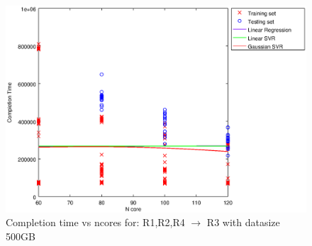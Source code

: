 
\begin {figure}[hbtp]
\centering
\includegraphics[width=\textwidth]{output/R1,R2,R4_R3_500_ALL_FEATURES/plot_R1,R2,R4_R3_500_bestmodels.eps}
\caption{Completion time vs ncores for: R1,R2,R4 $\rightarrow$ R3 with datasize 500GB}
\label{fig:coreonly_linear_R1,R2,R4_R3_500}
\end {figure}
